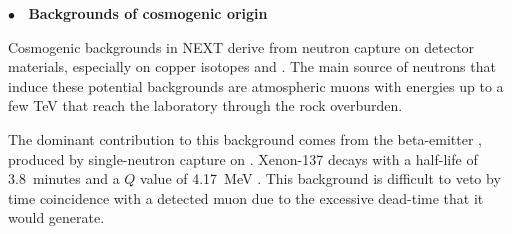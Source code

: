 \indent

{\bf $\bullet$~ Backgrounds of cosmogenic origin}
\label{sec:muons}

Cosmogenic backgrounds in NEXT derive from neutron capture on detector materials, especially on copper isotopes and . The main source of neutrons that induce these potential backgrounds are atmospheric muons with energies up to a few TeV that reach the laboratory through the rock overburden. 

\indent

The dominant contribution to this background comes from the beta-emitter , produced by single-neutron capture on . Xenon-137 decays with a half-life of \SI{3.8}{minutes} and a $Q$ value of \SI{4.17}{\mega\eV} \cite{nudat}. This background is difficult to veto by time coincidence with a detected muon due to the excessive dead-time that it would generate. 

